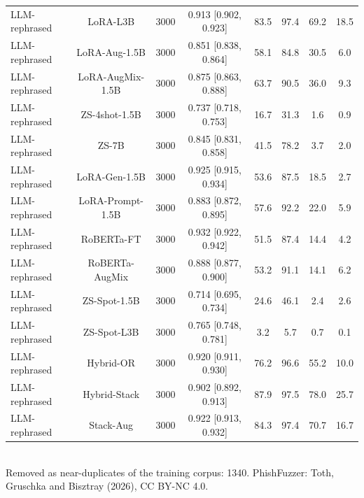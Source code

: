 \begin{table}[t]
\begin{tabular}{lccccccc}
LLM-rephrased & LoRA-L3B & 3000 & 0.913 [0.902, 0.923] & 83.5 & 97.4 & 69.2 & 18.5 \\
LLM-rephrased & LoRA-Aug-1.5B & 3000 & 0.851 [0.838, 0.864] & 58.1 & 84.8 & 30.5 & 6.0 \\
LLM-rephrased & LoRA-AugMix-1.5B & 3000 & 0.875 [0.863, 0.888] & 63.7 & 90.5 & 36.0 & 9.3 \\
LLM-rephrased & ZS-4shot-1.5B & 3000 & 0.737 [0.718, 0.753] & 16.7 & 31.3 & 1.6 & 0.9 \\
LLM-rephrased & ZS-7B & 3000 & 0.845 [0.831, 0.858] & 41.5 & 78.2 & 3.7 & 2.0 \\
LLM-rephrased & LoRA-Gen-1.5B & 3000 & 0.925 [0.915, 0.934] & 53.6 & 87.5 & 18.5 & 2.7 \\
LLM-rephrased & LoRA-Prompt-1.5B & 3000 & 0.883 [0.872, 0.895] & 57.6 & 92.2 & 22.0 & 5.9 \\
LLM-rephrased & RoBERTa-FT & 3000 & 0.932 [0.922, 0.942] & 51.5 & 87.4 & 14.4 & 4.2 \\
LLM-rephrased & RoBERTa-AugMix & 3000 & 0.888 [0.877, 0.900] & 53.2 & 91.1 & 14.1 & 6.2 \\
LLM-rephrased & ZS-Spot-1.5B & 3000 & 0.714 [0.695, 0.734] & 24.6 & 46.1 & 2.4 & 2.6 \\
LLM-rephrased & ZS-Spot-L3B & 3000 & 0.765 [0.748, 0.781] & 3.2 & 5.7 & 0.7 & 0.1 \\
LLM-rephrased & Hybrid-OR & 3000 & 0.920 [0.911, 0.930] & 76.2 & 96.6 & 55.2 & 10.0 \\
LLM-rephrased & Hybrid-Stack & 3000 & 0.902 [0.892, 0.913] & 87.9 & 97.5 & 78.0 & 25.7 \\
LLM-rephrased & Stack-Aug & 3000 & 0.922 [0.913, 0.932] & 84.3 & 97.4 & 70.7 & 16.7 \\
\bottomrule
\end{tabular}
\\[2pt]{\scriptsize Removed as near-duplicates of the training corpus: 1340. PhishFuzzer: Toth, Gruschka and Bisztray (2026), CC BY-NC 4.0.}
\end{table}